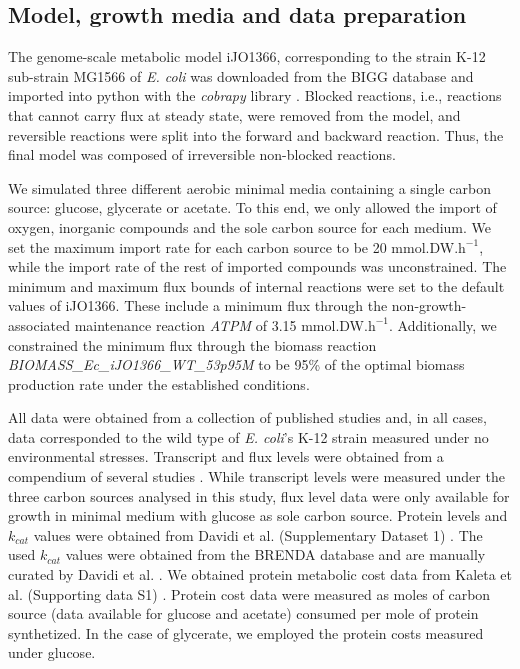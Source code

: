 \documentclass[12pt]{article}
\begin{document}
\subsection{Model, growth media and data preparation}
\label{sec:model}
The genome-scale metabolic model iJO1366, corresponding to the strain K-12 sub-strain MG1566 of \emph{E. coli} was downloaded from the BIGG database \cite{King2016} and imported into python with the \emph{cobrapy} library \cite{Ebrahim2013}. Blocked reactions, i.e., reactions that cannot carry flux at steady state, were removed from the model, and reversible reactions were split into the forward and backward reaction. Thus, the final model was composed of irreversible non-blocked reactions.

We simulated three different aerobic minimal media containing a single carbon source: glucose, glycerate or acetate. To this end, we only allowed the import of oxygen, inorganic compounds and the sole carbon source for each medium. We set the maximum import rate for each carbon source to be 20 mmol.DW.$\mathrm{h}^{-1}$, while the import rate of the rest of imported compounds was unconstrained. The minimum and maximum flux bounds of internal reactions were set to the default values of iJO1366. These include a minimum flux through the non-growth-associated maintenance reaction \emph{ATPM} of 3.15 mmol.DW.$\mathrm{h}^{-1}$. Additionally, we constrained the minimum flux through the biomass reaction \emph{BIOMASS\_Ec\_iJO1366\_WT\_53p95M} to be 95\% of the optimal biomass production rate under the established conditions.

All data were obtained from a collection of published studies and, in all cases, data corresponded to the wild type of \emph{E. coli}'s K-12 strain measured under no environmental stresses. Transcript and flux levels were obtained from a compendium of several studies \cite{Kim2016}. While transcript levels were measured under the three carbon sources analysed in this study, flux level data were only available for growth in minimal medium with glucose as sole carbon source. Protein levels and $k_{cat}$ values were obtained from Davidi et al. (Supplementary Dataset 1)  \cite{Davidi2016} . The used $k_{cat}$ values were obtained from the BRENDA database \cite{Jeske2019} and are manually curated by Davidi et al. \cite{Davidi2016} . We obtained protein metabolic cost data from Kaleta et al. (Supporting data S1)  \cite{Kaleta2013}. Protein cost data were measured as moles of carbon source (data available for glucose and acetate) consumed per mole of protein synthetized. In the case of glycerate, we employed the protein costs measured under glucose.
\end{document}
